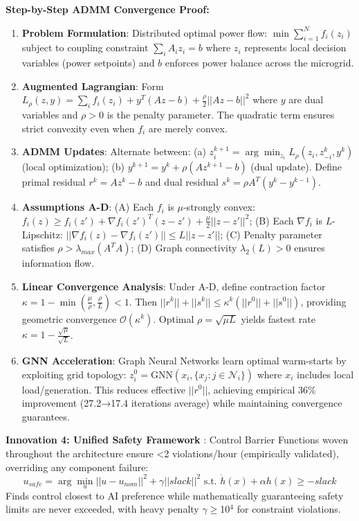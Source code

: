 \documentclass[12pt]{article}
\begin{document}
\textbf{Step-by-Step ADMM Convergence Proof:}
\begin{enumerate}
\item \textbf{Problem Formulation}: Distributed optimal power flow: $\min \sum_{i=1}^N f_i(z_i)$ subject to coupling constraint $\sum_i A_i z_i = b$ where $z_i$ represents local decision variables (power setpoints) and $b$ enforces power balance across the microgrid.
\item \textbf{Augmented Lagrangian}: Form $L_\rho(z,y) = \sum_i f_i(z_i) + y^T(Az - b) + \frac{\rho}{2}||Az - b||^2$ where $y$ are dual variables and $\rho > 0$ is the penalty parameter. The quadratic term ensures strict convexity even when $f_i$ are merely convex.
\item \textbf{ADMM Updates}: Alternate between: (a) $z_i^{k+1} = \arg\min_{z_i} L_\rho(z_i, z_{-i}^k, y^k)$ (local optimization); (b) $y^{k+1} = y^k + \rho(Az^{k+1} - b)$ (dual update). Define primal residual $r^k = Az^k - b$ and dual residual $s^k = \rho A^T(y^k - y^{k-1})$.
\item \textbf{Assumptions A-D}: (A) Each $f_i$ is $\mu$-strongly convex: $f_i(z) \geq f_i(z') + \nabla f_i(z')^T(z-z') + \frac{\mu}{2}||z-z'||^2$; (B) Each $\nabla f_i$ is $L$-Lipschitz: $||\nabla f_i(z) - \nabla f_i(z')|| \leq L||z-z'||$; (C) Penalty parameter satisfies $\rho > \lambda_{max}(A^T A)$; (D) Graph connectivity $\lambda_2(L) > 0$ ensures information flow.
\item \textbf{Linear Convergence Analysis}: Under A-D, define contraction factor $\kappa = 1 - \min\left(\frac{\mu}{\rho}, \frac{\rho}{L}\right) < 1$. Then $||r^k|| + ||s^k|| \leq \kappa^k(||r^0|| + ||s^0||)$, providing geometric convergence $\mathcal{O}(\kappa^k)$. Optimal $\rho = \sqrt{\mu L}$ yields fastest rate $\kappa = 1 - \frac{\sqrt{\mu}}{\sqrt{L}}$.
\item \textbf{GNN Acceleration}: Graph Neural Networks learn optimal warm-starts by exploiting grid topology: $z_i^0 = \text{GNN}(x_i, \{x_j : j \in \mathcal{N}_i\})$ where $x_i$ includes local load/generation. This reduces effective $||r^0||$, achieving empirical 36\% improvement (27.2→17.4 iterations average) while maintaining convergence guarantees.
\end{enumerate}

\textbf{Innovation 4: Unified Safety Framework} \cite{our2024theoretical}: Control Barrier Functions woven throughout the architecture ensure <2 violations/hour (empirically validated), overriding any component failure:
$$u_{safe} = \arg\min_u ||u - u_{nom}||^2 + \gamma||slack||^2 \text{ s.t. } \dot{h}(x) + \alpha h(x) \geq -slack$$
Finds control closest to AI preference while mathematically guaranteeing safety limits are never exceeded, with heavy penalty $\gamma\geq$10$^4$ for constraint violations.
\end{document}
